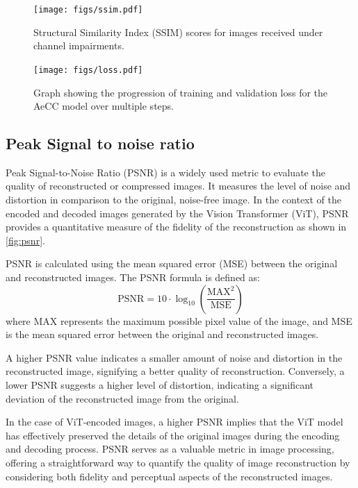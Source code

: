 \documentclass[10pt,twocolumn]{IEEEtran}
\begin{document}
\begin{figure}[t!]
    \centering
    \texttt{[image: figs/ssim.pdf]}
    \caption{Structural Similarity Index (SSIM) scores for images received under channel impairments.}
    \label{fig:ssi}
\end{figure}

\begin{figure}[t!]
    \centering
    \texttt{[image: figs/loss.pdf]}
    \caption{Graph showing the progression of training and validation loss for the AeCC model over multiple steps.}
    \label{fig:loss}
\end{figure}
\subsection{Peak Signal to noise ratio}
Peak Signal-to-Noise Ratio (PSNR) is a widely used metric to evaluate the quality of reconstructed or compressed images. It measures the level of noise and distortion in comparison to the original, noise-free image. In the context of the encoded and decoded images generated by the Vision Transformer (ViT), PSNR provides a quantitative measure of the fidelity of the reconstruction as shown in \ref{fig:psnr}.

PSNR is calculated using the mean squared error (MSE) between the original and reconstructed images. The PSNR formula is defined as:
\[
    \text{PSNR} = 10 \cdot \log_{10}\left(\frac{\text{MAX}^2}{\text{MSE}}\right)
\]
where MAX represents the maximum possible pixel value of the image, and MSE is the mean squared error between the original and reconstructed images.

A higher PSNR value indicates a smaller amount of noise and distortion in the reconstructed image, signifying a better quality of reconstruction. Conversely, a lower PSNR suggests a higher level of distortion, indicating a significant deviation of the reconstructed image from the original.

In the case of ViT-encoded images, a higher PSNR implies that the ViT model has effectively preserved the details of the original images during the encoding and decoding process. PSNR serves as a valuable metric in image processing, offering a straightforward way to quantify the quality of image reconstruction by considering both fidelity and perceptual aspects of the reconstructed images.
\end{document}
